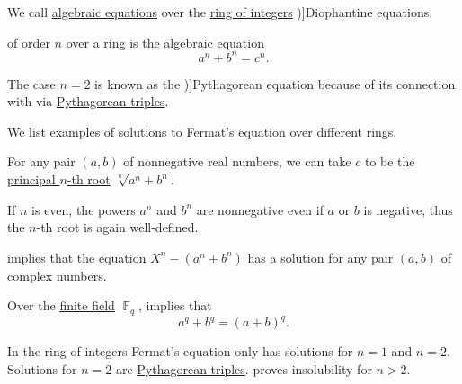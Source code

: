 \begin{definition}\label{def:diophantine_equation}
  We call \hyperref[def:algebraic_equation]{algebraic equations} over the \hyperref[def:ring_of_integers]{ring of integers} \term[ru=Диофантово уравнение (\cite[\S 1.9]{ШеньВерещагин2017ВычислимыеФункции})]{Diophantine equations}.
\end{definition}

\begin{definition}\label{def:fermats_equation}
   of order \( n \) over a \hyperref[def:ring]{ring} is the \hyperref[def:algebraic_equation]{algebraic equation}
  \begin{equation}\label{eq:def:fermats_equation}
    a^n + b^n = c^n.
  \end{equation}

  The case \( n = 2 \) is known as the \term[en=Pythagorean equation (\cite[\S 4.3.1]{Deza2012FigurateNumbers})]{Pythagorean equation} because of its connection with  via \hyperref[def:pythagorean_triples]{Pythagorean triples}.
\end{definition}

\begin{example}\label{ex:def:fermats_equation}
  We list examples of solutions to \hyperref[def:fermats_equation]{Fermat's equation} over different rings.
  \begin{thmenum}
     For any pair \( (a, b) \) of nonnegative real numbers, we can take \( c \) to be the \hyperref[def:principal_nonnegative_nth_root]{principal \( n \)-th root} \( \sqrt[n]{ a^n + b^n } \).

    If \( n \) is even, the powers \( a^n \) and \( b^n \) are nonnegative even if \( a \) or \( b \) is negative, thus the \( n \)-th root is again well-defined.

      implies that the equation \( X^n - (a^n + b^n) \) has a solution for any pair \( (a, b) \) of complex numbers.

     Over the \hyperref[def:finite_field]{finite field} \( \BbbF_q \),  implies that
    \begin{equation*}
      a^q + b^q = (a + b)^q.
    \end{equation*}

     In the ring of integers Fermat's equation only has solutions for \( n = 1 \) and \( n = 2 \). Solutions for \( n = 2 \) are \hyperref[def:pythagorean_triple]{Pythagorean triples}.  proves insolubility for \( n > 2 \).
  \end{thmenum}
\end{example}

